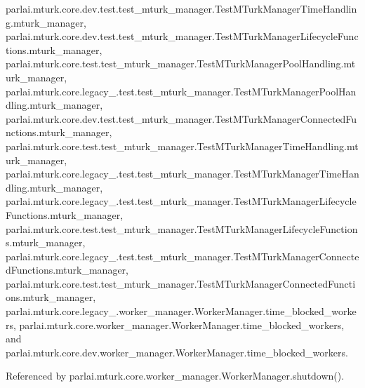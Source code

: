 parlai.\+mturk.\+core.\+dev.\+test.\+test\+\_\+mturk\+\_\+manager.\+Test\+M\+Turk\+Manager\+Time\+Handling.\+mturk\+\_\+manager, parlai.\+mturk.\+core.\+dev.\+test.\+test\+\_\+mturk\+\_\+manager.\+Test\+M\+Turk\+Manager\+Lifecycle\+Functions.\+mturk\+\_\+manager, parlai.\+mturk.\+core.\+test.\+test\+\_\+mturk\+\_\+manager.\+Test\+M\+Turk\+Manager\+Pool\+Handling.\+mturk\+\_\+manager, parlai.\+mturk.\+core.\+legacy\+\_.\+test.\+test\+\_\+mturk\+\_\+manager.\+Test\+M\+Turk\+Manager\+Pool\+Handling.\+mturk\+\_\+manager, parlai.\+mturk.\+core.\+dev.\+test.\+test\+\_\+mturk\+\_\+manager.\+Test\+M\+Turk\+Manager\+Connected\+Functions.\+mturk\+\_\+manager, parlai.\+mturk.\+core.\+test.\+test\+\_\+mturk\+\_\+manager.\+Test\+M\+Turk\+Manager\+Time\+Handling.\+mturk\+\_\+manager, parlai.\+mturk.\+core.\+legacy\+\_.\+test.\+test\+\_\+mturk\+\_\+manager.\+Test\+M\+Turk\+Manager\+Time\+Handling.\+mturk\+\_\+manager, parlai.\+mturk.\+core.\+legacy\+\_.\+test.\+test\+\_\+mturk\+\_\+manager.\+Test\+M\+Turk\+Manager\+Lifecycle\+Functions.\+mturk\+\_\+manager, parlai.\+mturk.\+core.\+test.\+test\+\_\+mturk\+\_\+manager.\+Test\+M\+Turk\+Manager\+Lifecycle\+Functions.\+mturk\+\_\+manager, parlai.\+mturk.\+core.\+legacy\+\_.\+test.\+test\+\_\+mturk\+\_\+manager.\+Test\+M\+Turk\+Manager\+Connected\+Functions.\+mturk\+\_\+manager, parlai.\+mturk.\+core.\+test.\+test\+\_\+mturk\+\_\+manager.\+Test\+M\+Turk\+Manager\+Connected\+Functions.\+mturk\+\_\+manager, parlai.\+mturk.\+core.\+legacy\+\_.\+worker\+\_\+manager.\+Worker\+Manager.\+time\+\_\+blocked\+\_\+workers, parlai.\+mturk.\+core.\+worker\+\_\+manager.\+Worker\+Manager.\+time\+\_\+blocked\+\_\+workers, and parlai.\+mturk.\+core.\+dev.\+worker\+\_\+manager.\+Worker\+Manager.\+time\+\_\+blocked\+\_\+workers.



Referenced by parlai.\+mturk.\+core.\+worker\+\_\+manager.\+Worker\+Manager.\+shutdown().

